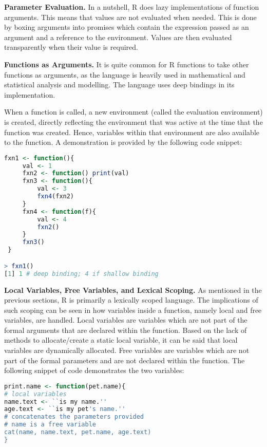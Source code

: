 \documentclass[12pt]{article}
\begin{document}
\textbf{Parameter Evaluation.} In a nutshell, R does lazy implementations of function arguments. This means that values are not evaluated when needed. This is done by boxing arguments into promises which contain the expression passed as an argument and a reference to the environment. Values are then evaluated transparently when their value is required.

\textbf{Functions as Arguments.} It is quite common for R functions to take other functions as arguments, as the language is heavily used in mathematical and statistical analysis and modelling. The language uses deep bindings in its implementation.

When a function is called, a new environment (called the evaluation environment) is created, directly reflecting  the environment that was active at the time that the function was created. Hence, variables within that environment are also available to the function. A demonstration is provided by the following code snippet:

\begin{lstlisting}[language=R, frame=none]
 fxn1 <- function(){
     val <- 1
     fxn2 <- function() print(val)
     fxn3 <- function(){
         val <- 3
         fxn4(fxn2)
     }
     fxn4 <- function(f){
         val <- 4
         fxn2()
     }
     fxn3()
 }

> fxn1()
[1] 1 # deep binding; 4 if shallow binding
\end{lstlisting}

\textbf{Local Variables, Free Variables, and Lexical Scoping.} As mentioned in the previous sections, R is primarily a lexically scoped language. The implications of such scoping can be seen in how variables inside a function, namely local and free variables, are handled. Local variables are variables which are not part of the formal arguments that are declared within the function. Based on the lack of methods to allocate/create a static local variable, it can be said that local variables are dynamically allocated. Free variables are variables which are not part of the formal parameters and are not declared within the function. The following snippet of code demonstrates the two variables:

\begin{lstlisting}[language=R, frame=none]
print.name <- function(pet.name){
# local variables
name.text <- ``is my name.''
age.text <- ``is my pet's name.''
# concatenates the parameters provided
# name is a free variable
cat(name, name.text, pet.name, age.text)
}
\end{lstlisting}
\end{document}
